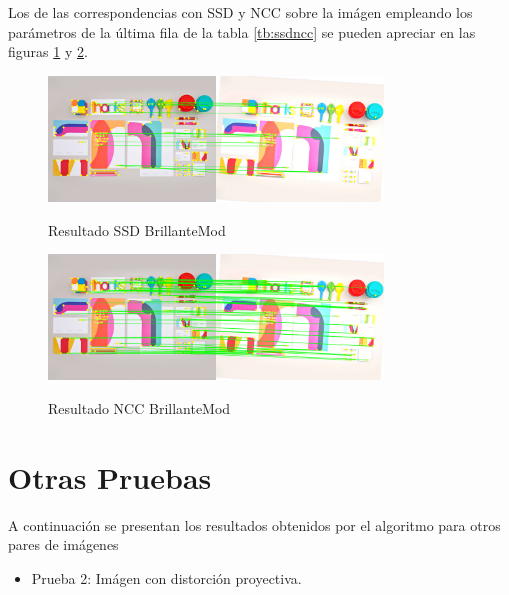 \documentclass{IEEEtran}
\begin{document}
Los de las correspondencias con SSD y NCC sobre la imágen empleando
los parámetros de la última fila de la tabla \ref{tb:ssdncc}
se pueden apreciar en las figuras \ref{fig:ssdlight} y \ref{fig:ncclight}.

\begin{figure}[H]
\caption{Resultado SSD BrillanteMod}
\centering
\includegraphics[width=8.9cm,natwidth=1200,natheight=450]{figs/ssdlight.png}
\label{fig:ssdlight}
\end{figure} 

\begin{figure}[H]
\caption{Resultado NCC BrillanteMod}
\centering
\includegraphics[width=8.9cm,natwidth=1200,natheight=450]{figs/ncclight.png}
\label{fig:ncclight}
\end{figure} 
\section{Otras Pruebas}
A continuación se presentan los resultados obtenidos por el algoritmo
para otros pares de imágenes

\begin{itemize}
\item Prueba 2: Imágen con distorción proyectiva.
\end{itemize} 
\end{document}
